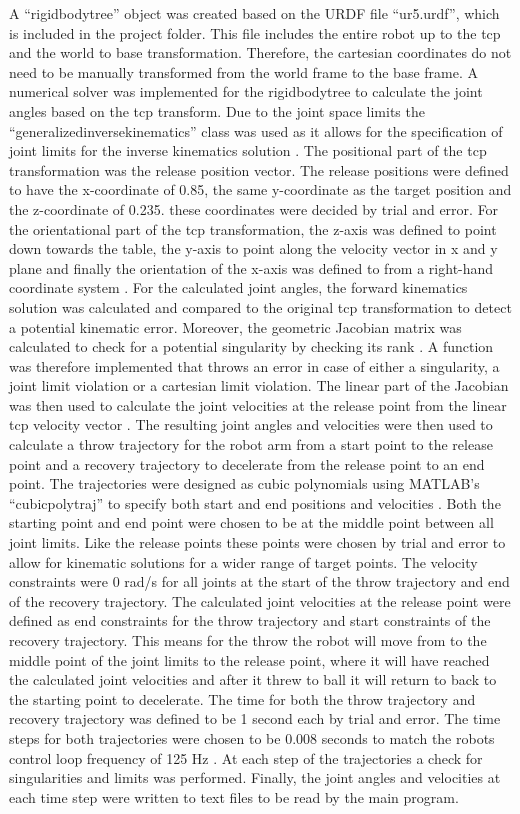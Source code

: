 A “rigidbodytree” object \cite{rigidBodyTree} was created based on the URDF file “ur5.urdf”, which is included in the project folder. This file includes the entire robot up to the tcp and the world to base transformation. Therefore, the cartesian coordinates do not need to be manually transformed from the world frame to the base frame. A numerical solver was implemented for the rigidbodytree to calculate the joint angles based on the tcp transform. Due to the joint space limits the “generalizedinversekinematics” class was used as it allows for the specification of joint limits for the inverse kinematics solution \cite{generalizedIK}. The positional part of the tcp transformation was the release position vector. The release positions were defined to have the x-coordinate of 0.85, the same y-coordinate as the target position and the z-coordinate of 0.235. these coordinates were decided by trial and error. For the orientational part of the tcp transformation, the z-axis was defined to point down towards the table, the y-axis to point along the velocity vector in x and y plane and finally the orientation of the x-axis was defined to from a right-hand coordinate system \cite{rightHandRule}. For the calculated joint angles, the forward kinematics solution was calculated and compared to the original tcp transformation to detect a potential kinematic error. Moreover, the geometric Jacobian matrix was calculated to check for a potential singularity by checking its rank \cite{kinematicsLecture10}. A function was therefore implemented that throws an error in case of either a singularity, a joint limit violation or a cartesian limit violation. The linear part of the Jacobian was then used to calculate the joint velocities at the release point from the linear tcp velocity vector \cite{kinematicsLecture10}. The resulting joint angles and velocities were then used to calculate a throw trajectory for the robot arm from a start point to the release point and a recovery trajectory to decelerate from the release point to an end point. The trajectories were designed as cubic polynomials using MATLAB’s “cubicpolytraj” \cite{cubicPolyTraj} to specify both start and end positions and velocities \cite{kinematicsLecture9}. Both the starting point and end point were chosen to be at the middle point between all joint limits. Like the release points these points were chosen by trial and error to allow for kinematic solutions for a wider range of target points. The velocity constraints were 0 rad/s for all joints at the start of the throw trajectory and end of the recovery trajectory. The calculated joint velocities at the release point were defined as end constraints for the throw trajectory and start constraints of the recovery trajectory. This means for the throw the robot will move from to the middle point of the joint limits to the release point, where it will have reached the calculated joint velocities and after it threw to ball it will return to back to the starting point to decelerate. The time for both the throw trajectory and recovery trajectory was defined to be 1 second each by trial and error. The time steps for both trajectories were chosen to be 0.008 seconds to match the robots control loop frequency of 125 Hz \cite{controlFrequency}. At each step of the trajectories a check for singularities and limits was performed. Finally, the joint angles and velocities at each time step were written to text files to be read by the main program. 
